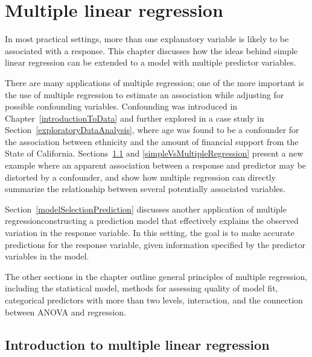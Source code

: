 
\chapter{Multiple linear regression}
\label{multipleLinearRegression}

In most practical settings, more than one explanatory variable is likely to be associated with a response. This chapter discusses how the ideas behind simple linear regression can be extended to a model with multiple predictor variables. 

There are many applications of multiple regression; one of the more important is the use of multiple regression to estimate an association while adjusting for possible confounding variables. Confounding was introduced in Chapter~\ref{introductionToData} and further explored in a case study in Section~\ref{exploratoryDataAnalysis}, where age was found to be a confounder for the association between ethnicity and the amount of financial support from the State of California. Sections~\ref{introductionMultipleLinearRegression} and \ref{simpleVsMultipleRegression} present a new example where an apparent association between a response and predictor may be distorted by a confounder, and show how multiple regression can directly summarize the relationship between several potentially associated variables.

Section~\ref{modelSelectionPrediction} discusses another application of multiple regression\textemdash constructing a prediction model that effectively explains the observed variation in the response variable. In this setting, the goal is to make accurate predictions for the response variable, given information specified by the predictor variables in the model.

The other sections in the chapter outline general principles of multiple regression, including the statistical model, methods for assessing quality of model fit, categorical predictors with more than two levels, interaction, and the connection between ANOVA and regression.



\section{Introduction to multiple linear regression}
\label{introductionMultipleLinearRegression}

